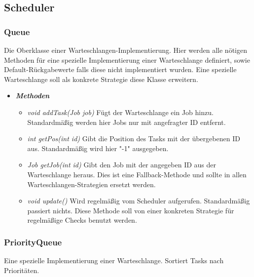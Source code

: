 \documentclass[a4paper,12pt]{article}
\begin{document}
\subsection{Scheduler}

\subsubsection{Queue}

Die Oberklasse einer Warteschlangen-Implementierung. Hier werden alle nötigen Methoden für eine spezielle Implementierung einer Warteschlange definiert, sowie Default-Rückgabewerte falls diese nicht implementiert wurden. Eine spezielle Warteschlange soll als konkrete Strategie diese Klasse erweitern.

\begin{itemize}[label={}]

\item \textit{\textbf{Methoden}}
\begin{itemize}[label={\textbullet}]
	
	\item \textit{void addTask(Job job)} Fügt der Warteschlange ein Job hinzu. Standardmäßig werden hier Jobs nur mit angefragter ID entfernt.

\item \textit{int getPos(int id)} Gibt die Position des Tasks mit der übergebenen ID aus. Standardmäßig wird hier "-1" ausgegeben.

\item \textit{Job getJob(int id)} Gibt den Job mit der angegeben ID aus der Warteschlange heraus. Dies ist eine Fallback-Methode und sollte in allen Warteschlangen-Strategien ersetzt werden. 

\item \textit{void update()} Wird regelmäßig vom Scheduler aufgerufen. Standardmäßig passiert nichts. Diese Methode soll von einer konkreten Strategie für regelmäßige Checks benutzt werden.

\end{itemize}

\end{itemize}

\subsubsection{PriorityQueue}

Eine spezielle Implementierung einer Warteschlange. Sortiert Tasks nach Prioritäten.
\end{document}
